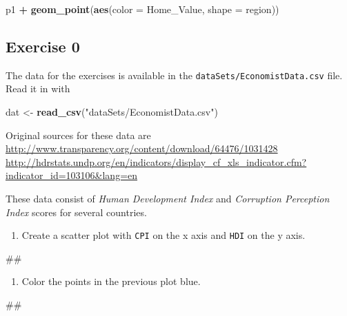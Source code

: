 \documentclass[]{book}
\newenvironment{Shaded}{\begin{snugshade}}{\end{snugshade}}
\newcommand{\KeywordTok}[1]{\textcolor[rgb]{0.13,0.29,0.53}{\textbf{#1}}}
\newcommand{\DataTypeTok}[1]{\textcolor[rgb]{0.13,0.29,0.53}{#1}}
\newcommand{\StringTok}[1]{\textcolor[rgb]{0.31,0.60,0.02}{#1}}
\newcommand{\OperatorTok}[1]{\textcolor[rgb]{0.81,0.36,0.00}{\textbf{#1}}}
\newcommand{\NormalTok}[1]{#1}
\providecommand{\tightlist}{%
  \setlength{\itemsep}{0pt}\setlength{\parskip}{0pt}}
\begin{document}
\begin{Shaded}
\begin{Highlighting}[]
\NormalTok{p1 }\OperatorTok{+}
\StringTok{  }\KeywordTok{geom_point}\NormalTok{(}\KeywordTok{aes}\NormalTok{(}\DataTypeTok{color =}\NormalTok{ Home_Value, }\DataTypeTok{shape =}\NormalTok{ region))}
\end{Highlighting}
\end{Shaded}

\subsection{Exercise 0}\label{exercise-0-2}

The data for the exercises is available in the
\texttt{dataSets/EconomistData.csv} file. Read it in with

\begin{Shaded}
\begin{Highlighting}[]
\NormalTok{dat <-}\StringTok{ }\KeywordTok{read_csv}\NormalTok{(}\StringTok{"dataSets/EconomistData.csv"}\NormalTok{)}
\end{Highlighting}
\end{Shaded}

Original sources for these data are
\url{http://www.transparency.org/content/download/64476/1031428}
\url{http://hdrstats.undp.org/en/indicators/display_cf_xls_indicator.cfm?indicator_id=103106\&lang=en}

These data consist of \emph{Human Development Index} and
\emph{Corruption Perception Index} scores for several countries.

\begin{enumerate}
\def\labelenumi{\arabic{enumi}.}
\tightlist
\item
  Create a scatter plot with \texttt{CPI} on the x axis and \texttt{HDI}
  on the y axis.
\end{enumerate}

\begin{Shaded}
\begin{Highlighting}[]
\NormalTok{## }
\end{Highlighting}
\end{Shaded}

\begin{enumerate}
\def\labelenumi{\arabic{enumi}.}
\setcounter{enumi}{1}
\tightlist
\item
  Color the points in the previous plot blue.
\end{enumerate}

\begin{Shaded}
\begin{Highlighting}[]
\NormalTok{## }
\end{Highlighting}
\end{Shaded}
\end{document}
